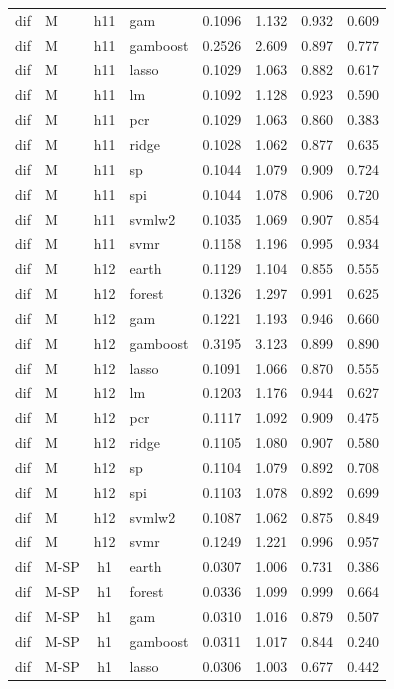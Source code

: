 \begin{ThreePartTable}
\begin{longtable}[t]{llclcccc}
dif & M & h11 & gam & 0.1096 & 1.132 & 0.932 & 0.609\\
dif & M & h11 & gamboost & 0.2526 & 2.609 & 0.897 & 0.777\\
dif & M & h11 & lasso & 0.1029 & 1.063 & 0.882 & 0.617\\
dif & M & h11 & lm & 0.1092 & 1.128 & 0.923 & 0.590\\
dif & M & h11 & pcr & 0.1029 & 1.063 & 0.860 & 0.383\\
dif & M & h11 & ridge & 0.1028 & 1.062 & 0.877 & 0.635\\
dif & M & h11 & sp & 0.1044 & 1.079 & 0.909 & 0.724\\
dif & M & h11 & spi & 0.1044 & 1.078 & 0.906 & 0.720\\
dif & M & h11 & svmlw2 & 0.1035 & 1.069 & 0.907 & 0.854\\
dif & M & h11 & svmr & 0.1158 & 1.196 & 0.995 & 0.934\\
\addlinespace
dif & M & h12 & earth & 0.1129 & 1.104 & 0.855 & 0.555\\
dif & M & h12 & forest & 0.1326 & 1.297 & 0.991 & 0.625\\
dif & M & h12 & gam & 0.1221 & 1.193 & 0.946 & 0.660\\
dif & M & h12 & gamboost & 0.3195 & 3.123 & 0.899 & 0.890\\
dif & M & h12 & lasso & 0.1091 & 1.066 & 0.870 & 0.555\\
dif & M & h12 & lm & 0.1203 & 1.176 & 0.944 & 0.627\\
dif & M & h12 & pcr & 0.1117 & 1.092 & 0.909 & 0.475\\
dif & M & h12 & ridge & 0.1105 & 1.080 & 0.907 & 0.580\\
dif & M & h12 & sp & 0.1104 & 1.079 & 0.892 & 0.708\\
dif & M & h12 & spi & 0.1103 & 1.078 & 0.892 & 0.699\\
dif & M & h12 & svmlw2 & 0.1087 & 1.062 & 0.875 & 0.849\\
dif & M & h12 & svmr & 0.1249 & 1.221 & 0.996 & 0.957\\
\addlinespace
dif & M-SP & h1 & earth & 0.0307 & 1.006 & 0.731 & 0.386\\
dif & M-SP & h1 & forest & 0.0336 & 1.099 & 0.999 & 0.664\\
dif & M-SP & h1 & gam & 0.0310 & 1.016 & 0.879 & 0.507\\
dif & M-SP & h1 & gamboost & 0.0311 & 1.017 & 0.844 & 0.240\\
dif & M-SP & h1 & lasso & 0.0306 & 1.003 & 0.677 & 0.442\\

\end{longtable}
\end{ThreePartTable}

